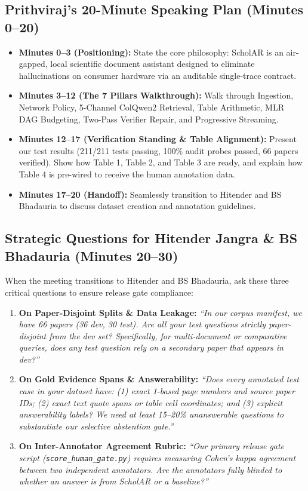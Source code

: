 \documentclass[11pt,a4paper]{article}
\begin{document}
\subsection{Prithviraj's 20-Minute Speaking Plan (Minutes 0--20)}
\begin{itemize}[leftmargin=*]
    \item \textbf{Minutes 0--3 (Positioning):} State the core philosophy: ScholAR is an air-gapped, local scientific document assistant designed to eliminate hallucinations on consumer hardware via an auditable single-trace contract.
    \item \textbf{Minutes 3--12 (The 7 Pillars Walkthrough):} Walk through Ingestion, Network Policy, 5-Channel ColQwen2 Retrieval, Table Arithmetic, MLR DAG Budgeting, Two-Pass Verifier Repair, and Progressive Streaming.
    \item \textbf{Minutes 12--17 (Verification Standing \& Table Alignment):} Present our test results (211/211 tests passing, 100\% audit probes passed, 66 papers verified). Show how Table 1, Table 2, and Table 3 are ready, and explain how Table 4 is pre-wired to receive the human annotation data.
    \item \textbf{Minutes 17--20 (Handoff):} Seamlessly transition to Hitender and BS Bhadauria to discuss dataset creation and annotation guidelines.
\end{itemize}

\subsection{Strategic Questions for Hitender Jangra \& BS Bhadauria (Minutes 20--30)}
When the meeting transitions to Hitender and BS Bhadauria, ask these three critical questions to ensure release gate compliance:
\begin{enumerate}[leftmargin=*]
    \item \textbf{On Paper-Disjoint Splits \& Data Leakage:}
    \emph{``In our corpus manifest, we have 66 papers (36 dev, 30 test). Are all your test questions strictly paper-disjoint from the dev set? Specifically, for multi-document or comparative queries, does any test question rely on a secondary paper that appears in dev?''}
    \item \textbf{On Gold Evidence Spans \& Answerability:}
    \emph{``Does every annotated test case in your dataset have: (1) exact 1-based page numbers and source paper IDs; (2) exact text quote spans or table cell coordinates; and (3) explicit answerability labels? We need at least 15--20\% unanswerable questions to substantiate our selective abstention gate.''}
    \item \textbf{On Inter-Annotator Agreement Rubric:}
    \emph{``Our primary release gate script (\texttt{score\_human\_gate.py}) requires measuring Cohen's kappa agreement between two independent annotators. Are the annotators fully blinded to whether an answer is from ScholAR or a baseline?''}
\end{enumerate}
\end{document}
